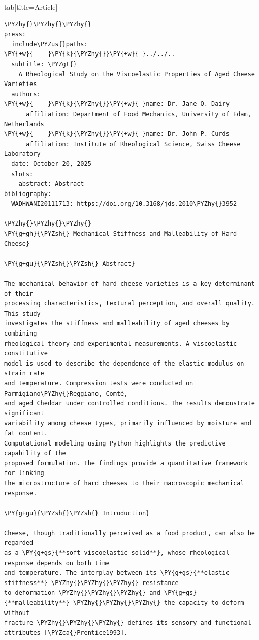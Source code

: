 \documentclass[a4paper,twoside]{article}
\begin{document}
\begin{tsdiv}{tab}[title=Article]
\begin{tscode}[lang=markdown, engine=pygments]
\begin{Verbatim}[commandchars=\\\{\},breaklines, breakanywhere, commandchars=\\\{\}]
\PYZhy{}\PYZhy{}\PYZhy{}
press:
  include\PYZus{}paths:
\PY{+w}{    }\PY{k}{\PYZhy{}}\PY{+w}{ }../../..
  subtitle: \PYZgt{}
    A Rheological Study on the Viscoelastic Properties of Aged Cheese Varieties
  authors:
\PY{+w}{    }\PY{k}{\PYZhy{}}\PY{+w}{ }name: Dr. Jane Q. Dairy
      affiliation: Department of Food Mechanics, University of Edam, Netherlands
\PY{+w}{    }\PY{k}{\PYZhy{}}\PY{+w}{ }name: Dr. John P. Curds
      affiliation: Institute of Rheological Science, Swiss Cheese Laboratory
  date: October 20, 2025
  slots:
    abstract: Abstract
bibliography:
  WADHWANI20111713: https://doi.org/10.3168/jds.2010\PYZhy{}3952

\PYZhy{}\PYZhy{}\PYZhy{}
\PY{g+gh}{\PYZsh{} Mechanical Stiffness and Malleability of Hard Cheese}

\PY{g+gu}{\PYZsh{}\PYZsh{} Abstract}

The mechanical behavior of hard cheese varieties is a key determinant of their
processing characteristics, textural perception, and overall quality. This study
investigates the stiffness and malleability of aged cheeses by combining
rheological theory and experimental measurements. A viscoelastic constitutive
model is used to describe the dependence of the elastic modulus on strain rate
and temperature. Compression tests were conducted on Parmigiano\PYZhy{}Reggiano, Comté,
and aged Cheddar under controlled conditions. The results demonstrate significant
variability among cheese types, primarily influenced by moisture and fat content.
Computational modeling using Python highlights the predictive capability of the
proposed formulation. The findings provide a quantitative framework for linking
the microstructure of hard cheeses to their macroscopic mechanical response.

\PY{g+gu}{\PYZsh{}\PYZsh{} Introduction}

Cheese, though traditionally perceived as a food product, can also be regarded
as a \PY{g+gs}{**soft viscoelastic solid**}, whose rheological response depends on both time
and temperature. The interplay between its \PY{g+gs}{**elastic stiffness**} \PYZhy{}\PYZhy{}\PYZhy{} resistance
to deformation \PYZhy{}\PYZhy{}\PYZhy{} and \PY{g+gs}{**malleability**} \PYZhy{}\PYZhy{}\PYZhy{} the capacity to deform without
fracture \PYZhy{}\PYZhy{}\PYZhy{} defines its sensory and functional attributes [\PYZca{}Prentice1993].


\end{Verbatim}
\end{tscode}
\end{tsdiv}
\end{document}
